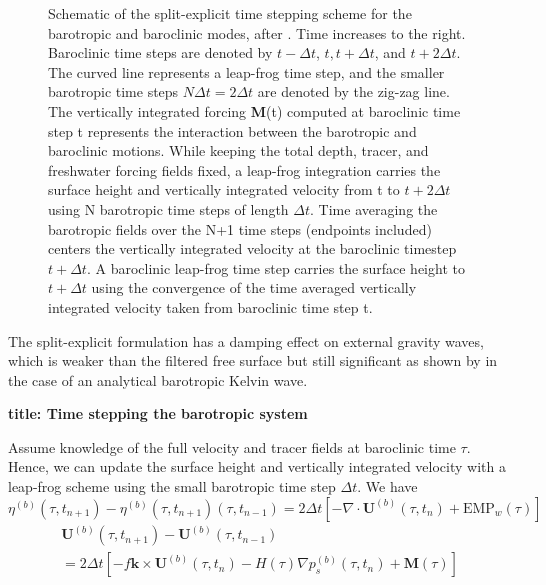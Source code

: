 \documentclass[../main/NEMO_manual]{subfiles}
\begin{document}
\begin{figure}[!t]
  \centering
  \caption[Schematic of the split-explicit time stepping scheme for
  the barotropic and baroclinic modes, after \citet{Griffies2004?}]{
    Schematic of the split-explicit time stepping scheme for the barotropic and baroclinic modes,
    after \citet{Griffies2004?}.
    Time increases to the right.
    Baroclinic time steps are denoted by $t-\Delta t$, $t, t+\Delta t$, and $t+2\Delta t$.
    The curved line represents a leap-frog time step,
    and the smaller barotropic time steps $N \Delta t=2\Delta t$ are denoted by the zig-zag line.
    The vertically integrated forcing \textbf{M}(t) computed at
    baroclinic time step t represents the interaction between the barotropic and baroclinic motions.
    While keeping the total depth, tracer, and freshwater forcing fields fixed,
    a leap-frog integration carries the surface height and vertically integrated velocity from
    t to $t+2 \Delta t$ using N barotropic time steps of length $\Delta t$.
    Time averaging the barotropic fields over the N+1 time steps (endpoints included)
    centers the vertically integrated velocity at the baroclinic timestep $t+\Delta t$.
    A baroclinic leap-frog time step carries the surface height to $t+\Delta t$ using
    the convergence of the time averaged vertically integrated velocity taken from
    baroclinic time step t.}
  \label{fig:MBZ_dyn_dynspg_ts}
\end{figure}

The split-explicit formulation has a damping effect on external gravity waves,
which is weaker than the filtered free surface but still significant as shown by \citet{levier.treguier.ea_trpt07} in
the case of an analytical barotropic Kelvin wave.


\textbf{title: Time stepping the barotropic system }

Assume knowledge of the full velocity and tracer fields at baroclinic time $\tau$.
Hence, we can update the surface height and vertically integrated velocity with a leap-frog scheme using
the small barotropic time step $\Delta t$.
We have
\[
  \eta^{(b)}(\tau,t_{n+1}) - \eta^{(b)}(\tau,t_{n+1}) (\tau,t_{n-1})
  = 2 \Delta t \left[-\nabla \cdot \textbf{U}^{(b)}(\tau,t_n) + \text{EMP}_w(\tau) \right]
\]
\begin{multline*}
  \textbf{U}^{(b)}(\tau,t_{n+1}) - \textbf{U}^{(b)}(\tau,t_{n-1})  \\
  = 2\Delta t \left[ - f \textbf{k} \times \textbf{U}^{(b)}(\tau,t_{n})
    - H(\tau) \nabla p_s^{(b)}(\tau,t_{n}) +\textbf{M}(\tau) \right]
\end{multline*}
\
\end{document}
